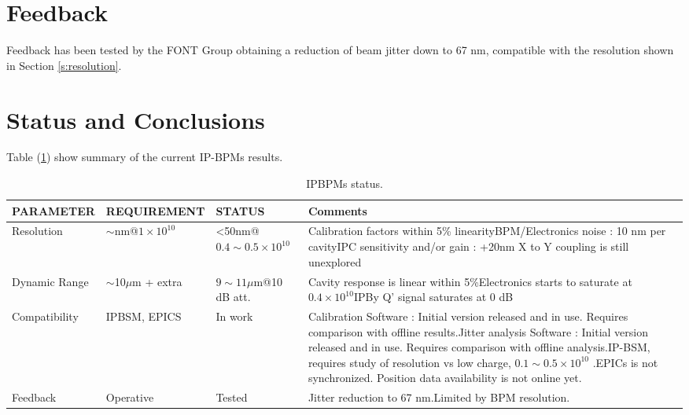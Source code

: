 \section{Feedback}
Feedback has been tested by the FONT Group \cite{FONTfb:2015} obtaining a reduction of beam jitter down to 67 nm, compatible with the resolution shown in Section \ref{s:resolution}.
\section{Status and Conclusions}
Table (\ref{t:IPBPMsStatus}) show summary of the current IP-BPMs results.\par
\begin{table}[hbt]
\centering
\scriptsize
\begin{tabular}{l|l|l|p{6cm}}\hline
PARAMETER & REQUIREMENT & STATUS & Comments\\\hline\hline
Resolution & $\sim$nm@$1\times10^{10}$ & <50nm@$0.4\sim0.5\times10^{10}$ & Calibration factors within 5\% linearity\newline BPM/Electronics noise : 10 nm per cavity\newline IPC sensitivity and/or gain : +20nm \newline X to Y coupling is still unexplored\\\hline
Dynamic Range & $\sim$10$\mu$m + extra & $9\sim11\mu$m@10 dB att. & Cavity response is linear within 5\%\newline Electronics starts to saturate at $0.4\times10^{10}$\newline IPBy Q' signal saturates at 0 dB\\\hline
Compatibility & IPBSM, EPICS & In work &Calibration Software : Initial version released and in use. Requires comparison with offline results.\newline Jitter analysis Software : Initial version released and in use. Requires comparison with offline analysis.\newline IP-BSM, requires study of resolution vs low charge, $0.1\sim0.5\times10^{10}$ .\newline EPICs is not synchronized. Position data availability is not online yet.\\\hline
Feedback & Operative & Tested	& Jitter reduction to 67 nm.\newline Limited by BPM resolution.\\\hline
\end{tabular}\caption{IPBPMs status.}\label{t:IPBPMsStatus}
\end{table}
